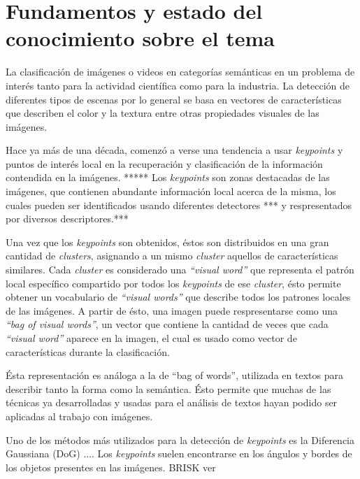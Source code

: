\section{Fundamentos y estado del conocimiento sobre el tema}
\iffalse
Escriba una breve introducción general al tema y cite y comente las mayores
contribuciones en el tema específico, incluyendo bibliografıa actualizada.
\fi
La clasificación de imágenes o videos en categorías semánticas en un problema de interés tanto para la actividad científica como
para la industria. La detección de diferentes tipos de escenas por lo general se basa en vectores de características que describen
el color y la textura entre otras propiedades visuales de las imágenes.

Hace ya más de una década, comenzó a verse una tendencia a usar \textit{keypoints} y puntos de interés local en la recuperación y
clasificación de la información contendida en la imágenes. ***** Los \textit{keypoints} son zonas destacadas de las imágenes, que contienen
abundante información local acerca de la misma, los cuales pueden ser identificados usando diferentes detectores *** y respresentados
por diversos descriptores.***

Una vez que los \textit{keypoints} son obtenidos, éstos son distribuidos en una gran cantidad de \textit{clusters}, asignando a un mismo
\textit{cluster} aquellos de características similares. Cada \textit{cluster} es considerado una \textit{\textquotedblleft visual word\textquotedblright}
que representa el patrón local específico compartido por todos los \textit{keypoints} de ese \textit{cluster}, ésto permite obtener un
vocabulario de \textit{\textquotedblleft visual words\textquotedblright} que describe todos los patrones locales de las imágenes. A partir
de ésto, una imagen puede respresentarse como una \textit{\textquotedblleft bag of visual words\textquotedblright}, un vector que contiene
la cantidad de veces que cada \textit{\textquotedblleft visual word\textquotedblright} aparece en la imagen, el cual es usado como vector
de características durante la clasificación.

Ésta representación es análoga a la de \textquotedblleft bag of words\textquotedblright, utilizada en textos para describir tanto la forma
como la semántica. Ésto permite que muchas de las técnicas ya desarrolladas y usadas para el análisis de textos hayan podido ser aplicadas
al trabajo con imágenes.

Uno de los métodos más utilizados para la detección de \textit{keypoints} es la Diferencia Gaussiana (DoG) .... Los \textit{keypoints} suelen
encontrarse en los ángulos y bordes de los objetos presentes en las imágenes. BRISK ver

